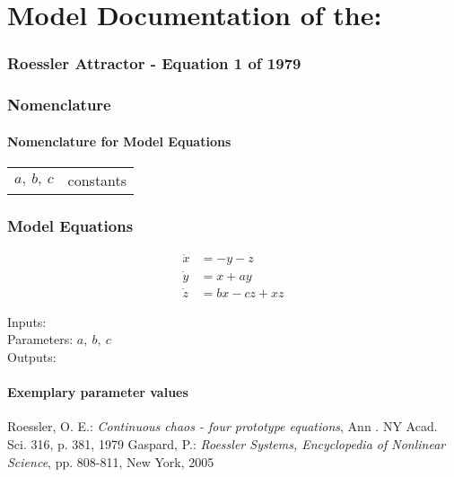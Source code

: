 \documentclass[10pt,a4paper]{article}
\begin{document}
	\part*{Model Documentation of the:}
	\section*{Roessler Attractor - Equation 1 of 1979} %
	
	
	\section{Nomenclature} %
	\subsection{Nomenclature for Model Equations} %
	
	\begin{tabular}{ll}
		$a,~b,~c$ & constants		
	\end{tabular}
	
	
	\section{Model Equations} %
	
	\begin{subequations}
	\begin{align}
		\dot{x} &= - y - z	\\
		\dot{y} &= x + ay \\
		\dot{z} &= bx - cz + xz    
	\end{align}
	\end{subequations}

	\noindent
	Inputs: 
	\\
	Parameters: $a,~b,~c$ %
	\\
	Outputs: 
	
	
	\subsection{Exemplary parameter values}
	

	
	
	\begin{thebibliography}{10}		
		Roessler, O. E.: 
		\textit{Continuous chaos - four prototype equations}, Ann . NY Acad. Sci. 316, p. 381, 1979
		Gaspard, P.: 
		\textit{Roessler Systems, Encyclopedia of Nonlinear Science}, pp. 808-811, New York, 2005
	\end{thebibliography}
\end{document}
